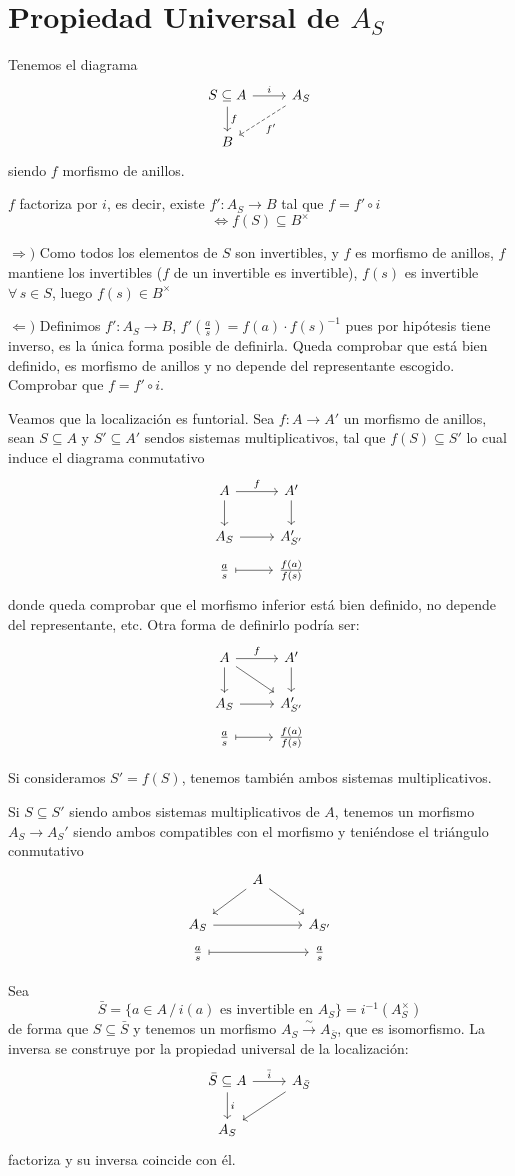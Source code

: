 \section{Propiedad Universal de $A_S$}
Tenemos el diagrama 
$$\bt  S \subseteq A \arrow{r}{i} \arrow{d}{f} & A_S \arrow[dashed]{ld}{f'} \\ 
B \et$$
siendo $f$ morfismo de anillos.
\begin{propi}[Universal de $A_S$]
$f$ factoriza por $i$, es decir, existe $f': A_S \longrightarrow B$ tal que $f = f' \circ i$ $$\iff f(S) \subseteq B^{\times}$$
  
\end{propi}
\begin{dem}
    
$\Rightarrow)$ Como todos los elementos de $S$ son invertibles, y $f$ es morfismo de anillos, $f$ mantiene los invertibles ($f$ de un invertible es invertible), $f(s)$ es invertible $\forall \, s \in S$, luego $f(s) \in B^{\times}$

$\Leftarrow)$ Definimos $f': A_S\longrightarrow B$, $f' (\frac{a}{s}) = f(a) \cdot f(s)^{-1}$ pues por hip\'otesis tiene inverso, es la \'unica forma posible de definirla. Queda comprobar que est\'a bien definido, es morfismo de anillos y no depende del representante escogido. Comprobar que $f=f'\circ i$. 

Veamos que la localizaci\'on es funtorial. Sea $f: A \longrightarrow A'$ un morfismo de anillos, sean $S\subseteq A$ y $S' \subseteq A'$ sendos sistemas multiplicativos, tal que $f(S) \subseteq S'$ lo cual induce el diagrama conmutativo
$$\bt A \arrow{d} \arrow{r}{f} & A'  \arrow{d} \\ A_S \arrow{r} & A'_{S'} \\[-5mm] \frac{a}{s} \arrow[mapsto]{r} & \frac{f(a)}{f(s)}  \et$$
donde queda comprobar que el morfismo inferior est\'a bien definido, no depende del representante, etc. Otra forma de definirlo podr\'ia ser:
$$\bt A \arrow{d} \arrow{rd} \arrow{r}{f} & A'  \arrow{d} \\ A_S \arrow{r} & A'_{S'} \\[-5mm] \frac{a}{s} \arrow[mapsto]{r} & \frac{f(a)}{f(s)}  \et$$

Si consideramos $S' = f(S)$, tenemos tambi\'en ambos sistemas multiplicativos. 

Si $S\subseteq S'$ siendo ambos sistemas multiplicativos de $A$, tenemos un morfismo \\
$A_S \longrightarrow A_S'$ siendo ambos compatibles con el morfismo y teni\'endose el tri\'angulo conmutativo
$$\bt & A \arrow{rd} \arrow{dl} & \\ A_S \arrow{rr} & & A_{S'} \\[-5mm] \frac{a}{s} \arrow[mapsto]{rr} & & \frac{a}{s}\et$$

Sea 
$$\bar S = \{a \in A \,  / \, i(a) \text{ es invertible en } A_S\} = i^{-1}(A_S^{\times})$$
de forma que $S\subseteq \bar S$ y tenemos un morfismo $A_S \overset{\sim}{\longrightarrow} A_{\bar S}$, que es isomorfismo. La inversa se construye por la propiedad universal de la localizaci\'on:
$$\bt \bar S \subseteq A \arrow{r}{\bar i} \arrow{d}{i} & A_{\bar S} \arrow{ld} \\ A_S \et$$
factoriza y su inversa coincide con \'el.
\end{dem}
